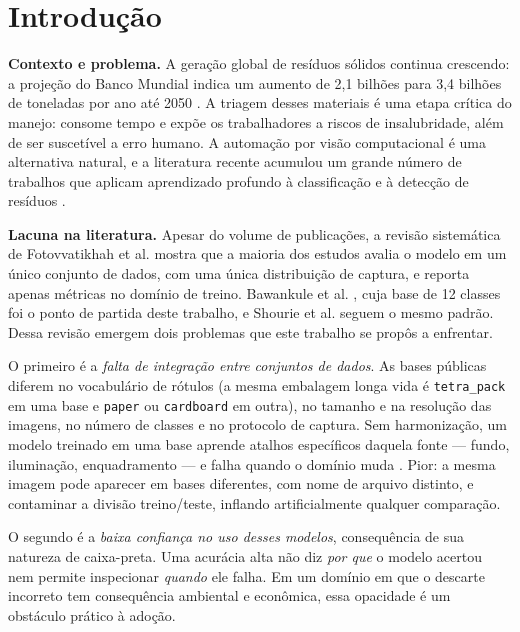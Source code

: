 \documentclass[11pt,a4paper]{article}
\begin{document}
	\section{Introdução}
	
	\textbf{Contexto e problema.} A geração global de resíduos sólidos continua crescendo: a projeção do Banco Mundial indica um aumento de 2,1 bilhões para 3,4 bilhões de toneladas por ano até 2050 \cite{kaza2018}. A triagem desses materiais é uma etapa crítica do manejo: consome tempo e expõe os trabalhadores a riscos de insalubridade, além de ser suscetível a erro humano. A automação por visão computacional é uma alternativa natural, e a literatura recente acumulou um grande número de trabalhos que aplicam aprendizado profundo à classificação e à detecção de resíduos \cite{fotovvatikhah2025,bawankule2023,shourie2024}.
	
	\textbf{Lacuna na literatura.} Apesar do volume de publicações, a revisão sistemática de Fotovvatikhah et al. \cite{fotovvatikhah2025} mostra que a maioria dos estudos avalia o modelo em um único conjunto de dados, com uma única distribuição de captura, e reporta apenas métricas no domínio de treino. Bawankule et al. \cite{bawankule2023}, cuja base de 12 classes foi o ponto de partida deste trabalho, e Shourie et al. \cite{shourie2024} seguem o mesmo padrão. Dessa revisão emergem dois problemas que este trabalho se propôs a enfrentar.
	
	O primeiro é a \emph{falta de integração entre conjuntos de dados}. As bases públicas diferem no vocabulário de rótulos (a mesma embalagem longa vida é \texttt{tetra\_pack} em uma base e \texttt{paper} ou \texttt{cardboard} em outra), no tamanho e na resolução das imagens, no número de classes e no protocolo de captura. Sem harmonização, um modelo treinado em uma base aprende atalhos específicos daquela fonte --- fundo, iluminação, enquadramento --- e falha quando o domínio muda \cite{geirhos2020,babe2025}. Pior: a mesma imagem pode aparecer em bases diferentes, com nome de arquivo distinto, e contaminar a divisão treino/teste, inflando artificialmente qualquer comparação.
	
	O segundo é a \emph{baixa confiança no uso desses modelos}, consequência de sua natureza de caixa-preta. Uma acurácia alta não diz \emph{por que} o modelo acertou nem permite inspecionar \emph{quando} ele falha. Em um domínio em que o descarte incorreto tem consequência ambiental e econômica, essa opacidade é um obstáculo prático à adoção.
	
\end{document}
